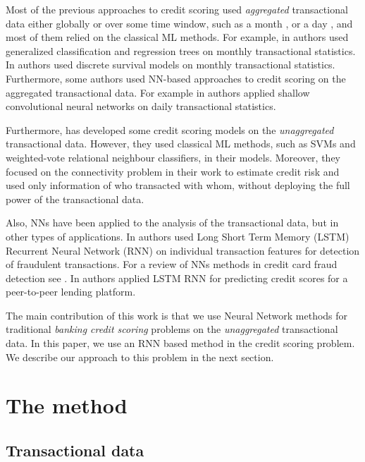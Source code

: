 \documentclass[sigconf]{acmart}
\begin{document}
Most of the previous approaches to credit scoring used {\em aggregated} transactional data either globally \cite{chi2012hybrid} or over some time window, such as a month \cite{khandani2010consumer}, \cite{bellotti2013forecasting} or a day \cite{KVAMME2018207}, and most of them relied on the classical ML methods. For example, in \cite{khandani2010consumer} authors used generalized classification and regression trees on monthly transactional statistics. In \cite{bellotti2013forecasting} authors used discrete survival models on monthly transactional statistics. Furthermore, some authors used NN-based approaches to credit scoring on the aggregated transactional data. For example in \cite{KVAMME2018207} authors applied shallow convolutional neural networks on daily transactional statistics.

Furthermore, \cite{RePEc} has developed some credit scoring models on the {\em unaggregated} transactional data. However, they used classical ML methods, such as SVMs and weighted-vote relational neighbour classifiers, in their models. Moreover, they focused on the connectivity problem in their work to estimate credit risk and used only information of who transacted with whom, without deploying the full power of the transactional data.

Also, NNs have been applied to the analysis of the transactional data, but in other types of applications. In \cite{fraud_lstm} authors used Long Short Term Memory (LSTM) Recurrent Neural Network (RNN) \cite{gers1999learning} on individual transaction features for detection of fraudulent transactions. For a review of NNs methods in credit card fraud detection see \cite{abdallah2016fraud}. In \cite{zhang2017credit}  authors applied LSTM RNN for predicting credit scores for a peer-to-peer lending platform.

The main contribution of this work is that we use Neural Network methods for traditional {\em banking credit scoring} problems on the {\em unaggregated} transactional data.
In this paper, we use an RNN based method in the credit scoring problem. We describe our approach to this problem in the next section.

\section{The method}

\subsection{Transactional data}
\end{document}
